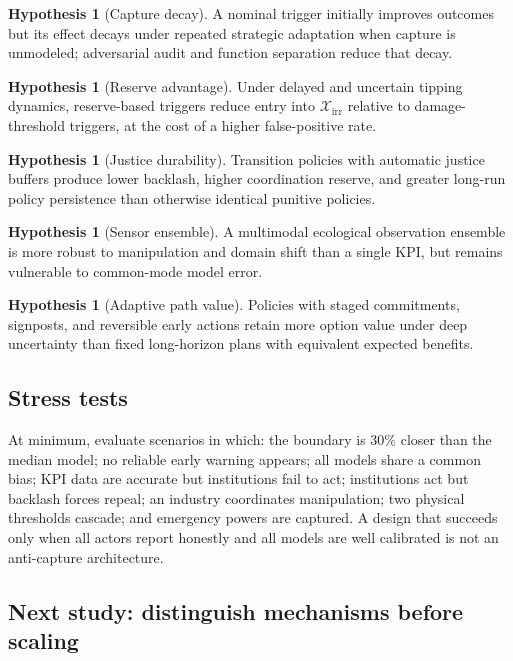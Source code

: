 \documentclass[11pt,a4paper]{article}
\numberwithin{equation}{section}
\theoremstyle{definition}
\newtheorem{hypothesis}[definition]{Hypothesis}
\theoremstyle{plain}
\theoremstyle{remark}
\newcommand{\irrev}{\mathcal{X}_{\mathrm{irr}}}
\begin{document}
\begin{hypothesis}[Capture decay]
A nominal trigger initially improves outcomes but its effect decays under repeated strategic adaptation when capture is unmodeled; adversarial audit and function separation reduce that decay.
\end{hypothesis}

\begin{hypothesis}[Reserve advantage]
Under delayed and uncertain tipping dynamics, reserve-based triggers reduce entry into $\irrev$ relative to damage-threshold triggers, at the cost of a higher false-positive rate.
\end{hypothesis}

\begin{hypothesis}[Justice durability]
Transition policies with automatic justice buffers produce lower backlash, higher coordination reserve, and greater long-run policy persistence than otherwise identical punitive policies.
\end{hypothesis}

\begin{hypothesis}[Sensor ensemble]
A multimodal ecological observation ensemble is more robust to manipulation and domain shift than a single KPI, but remains vulnerable to common-mode model error.
\end{hypothesis}

\begin{hypothesis}[Adaptive path value]
Policies with staged commitments, signposts, and reversible early actions retain more option value under deep uncertainty than fixed long-horizon plans with equivalent expected benefits.
\end{hypothesis}

\subsection{Stress tests}

At minimum, evaluate scenarios in which: the boundary is 30\% closer than the median model; no reliable early warning appears; all models share a common bias; KPI data are accurate but institutions fail to act; institutions act but backlash forces repeal; an industry coordinates manipulation; two physical thresholds cascade; and emergency powers are captured. A design that succeeds only when all actors report honestly and all models are well calibrated is not an anti-capture architecture.

\subsection{Next study: distinguish mechanisms before scaling}
\end{document}
